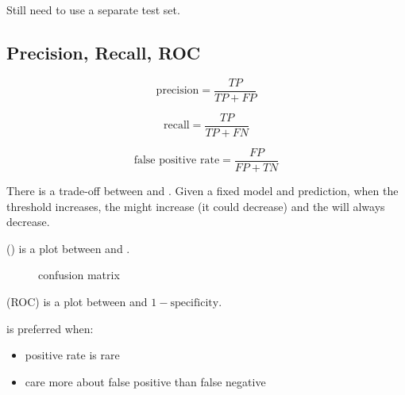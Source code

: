 Still need to use a separate test set.


\subsection{Precision, Recall, ROC}

\begin{equation}
	\text{precision} = \frac{TP}{TP + FP}
\end{equation}

\begin{equation}
	\text{recall} = \frac{TP}{TP + FN}
\end{equation}

\begin{equation}
	\text{false positive rate} = \frac{FP}{FP + TN}
\end{equation}

There is a trade-off between  and . Given a fixed model and prediction, when the threshold increases, the  might increase (it could decrease) and the  will always decrease. 

 () is a plot between  and . 

\begin{figure}[H]
\centering	
{}

\caption{confusion matrix}
\end{figure}


 (ROC) is a plot between  and $1 - \text{specificity}$.

 is preferred when:
\begin{itemize}
	\item positive rate is rare
	\item care more about false positive than false negative
\end{itemize}

